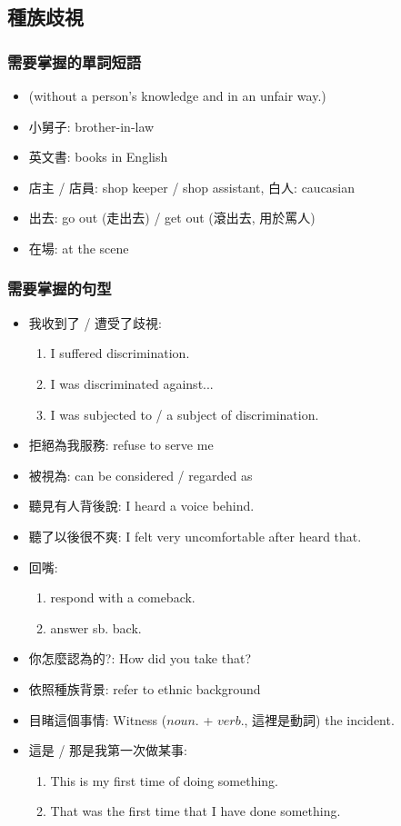 \subsection{種族歧視}
\subsubsection*{需要掌握的單詞短語}
\begin{itemize}
  \itemsep0em
  \item {} (without a person's knowledge and in an unfair way.)
  \item 小舅子: brother-in-law
  \item 英文書: books in English
  \item 店主 / 店員: shop keeper / shop assistant, 白人: caucasian
  \item 出去: go out (走出去) / get out (滾出去, 用於罵人)
  \item 在場: at the scene
\end{itemize}

\subsubsection*{需要掌握的句型}
\begin{itemize}
  \itemsep0em
  \item 我收到了 / 遭受了歧視:
  \begin{enumerate}
    \itemsep0em
    \item I suffered discrimination.
    \item I was discriminated against...
    \item I was subjected to / a subject of discrimination.
  \end{enumerate}
  \item 拒絕為我服務: refuse to serve me
  \item 被視為: can be considered / regarded as
  \item 聽見有人背後說: I heard a voice behind.
  \item 聽了以後很不爽: I felt very uncomfortable after heard that.
  \item 回嘴:
  \begin{enumerate}
    \itemsep0em
    \item respond with a comeback.
    \item answer sb. back.
  \end{enumerate}
  \item 你怎麼認為的?: How did you take that?
  \item 依照種族背景: refer to ethnic background
  \item 目睹這個事情: Witness ($noun.$ + $verb.$, 這裡是動詞) the incident.
  \item 這是 / 那是我第一次做某事:
  \begin{enumerate}
    \itemsep0em
    \item This is my first time of doing something.
    \item That was the first time that I have done something.
  \end{enumerate}
\end{itemize}


